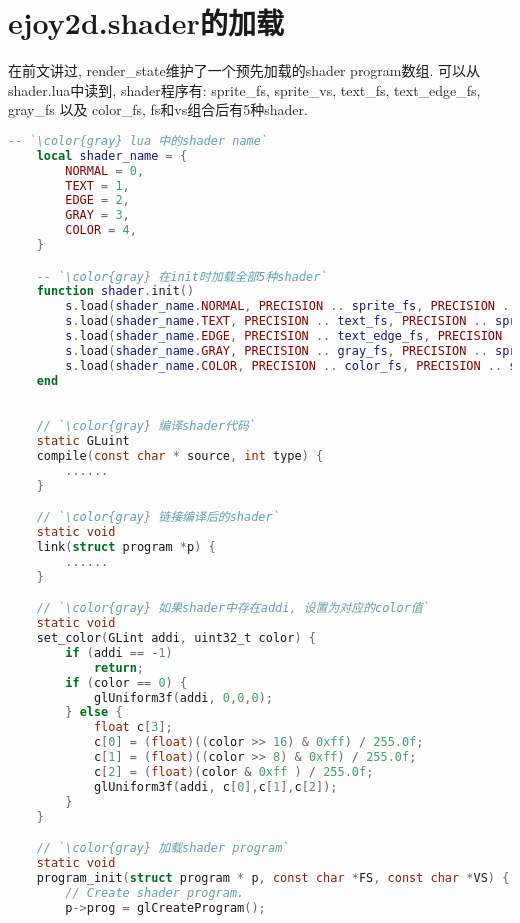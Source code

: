 \section {\ZHH ejoy2d.shader的加载} {

    {在前文讲过, render\_state维护了一个预先加载的shader program数组. 可以从shader.lua中读到, shader程序有: sprite\_fs, sprite\_vs, text\_fs, text\_edge\_fs, gray\_fs 以及 color\_fs, fs和vs组合后有5种shader. }\par

    \begin{lstlisting}[language=lua]
    -- `\color{gray} lua 中的shader name`
    local shader_name = {
        NORMAL = 0,
        TEXT = 1,
        EDGE = 2,
        GRAY = 3,
        COLOR = 4,
    }

    -- `\color{gray} 在init时加载全部5种shader`
    function shader.init()
        s.load(shader_name.NORMAL, PRECISION .. sprite_fs, PRECISION .. sprite_vs)
        s.load(shader_name.TEXT, PRECISION .. text_fs, PRECISION .. sprite_vs)
        s.load(shader_name.EDGE, PRECISION .. text_edge_fs, PRECISION .. sprite_vs)
        s.load(shader_name.GRAY, PRECISION .. gray_fs, PRECISION .. sprite_vs)
        s.load(shader_name.COLOR, PRECISION .. color_fs, PRECISION .. sprite_vs)
    end
    \end{lstlisting}

    \begin{lstlisting}[language=C]

    // `\color{gray} 编译shader代码`
    static GLuint
    compile(const char * source, int type) {
        ......
    }

    // `\color{gray} 链接编译后的shader`
    static void
    link(struct program *p) {
        ......
    }

    // `\color{gray} 如果shader中存在addi, 设置为对应的color值`
    static void
    set_color(GLint addi, uint32_t color) {
        if (addi == -1)
            return;
        if (color == 0) {
            glUniform3f(addi, 0,0,0);
        } else {
            float c[3];
            c[0] = (float)((color >> 16) & 0xff) / 255.0f;
            c[1] = (float)((color >> 8) & 0xff) / 255.0f;
            c[2] = (float)(color & 0xff ) / 255.0f;
            glUniform3f(addi, c[0],c[1],c[2]);
        }
    }

    // `\color{gray} 加载shader program`
    static void
    program_init(struct program * p, const char *FS, const char *VS) {
        // Create shader program.
        p->prog = glCreateProgram();


\end{lstlisting}}
